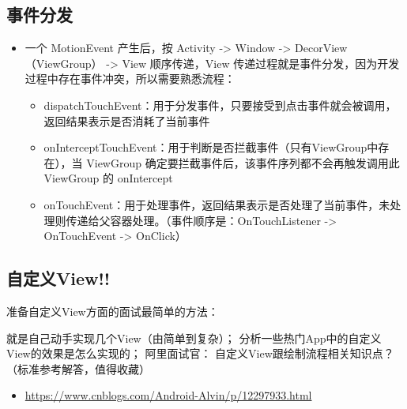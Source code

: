 \documentclass[9pt, b5paper]{article}
\begin{document}
\subsection{事件分发}
\label{sec-6-2}
\begin{itemize}
\item 一个 MotionEvent 产生后，按 Activity -> Window -> DecorView（ViewGroup） -> View 顺序传递，View 传递过程就是事件分发，因为开发过程中存在事件冲突，所以需要熟悉流程：
\begin{itemize}
\item dispatchTouchEvent：用于分发事件，只要接受到点击事件就会被调用，返回结果表示是否消耗了当前事件
\item onInterceptTouchEvent：用于判断是否拦截事件（只有ViewGroup中存在），当 ViewGroup 确定要拦截事件后，该事件序列都不会再触发调用此 ViewGroup 的 onIntercept
\item onTouchEvent：用于处理事件，返回结果表示是否处理了当前事件，未处理则传递给父容器处理。（事件顺序是：OnTouchListener -> OnTouchEvent -> OnClick）
\end{itemize}
\end{itemize}
\subsection{自定义View!!}
\label{sec-6-3}
准备自定义View方面的面试最简单的方法：

就是自己动手实现几个View（由简单到复杂）；
分析一些热门App中的自定义View的效果是怎么实现的；
阿里面试官： 自定义View跟绘制流程相关知识点？（标准参考解答，值得收藏）
\begin{itemize}
\item \url{https://www.cnblogs.com/Android-Alvin/p/12297933.html}
\end{itemize}
\end{document}
